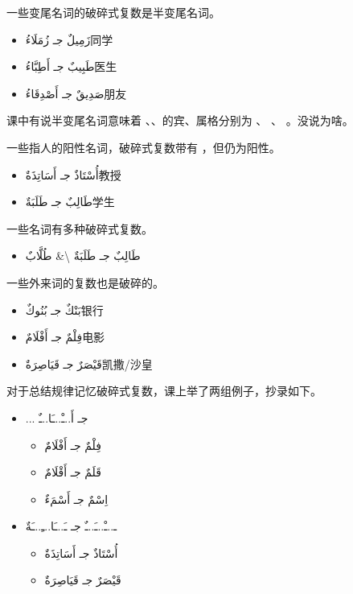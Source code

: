 一些变尾名词的破碎式复数是半变尾名词。

\begin{itemize}
    \item \ac{زَمِيلٌ جـ زُمَلَاءُ}{同学}
    \item \ac{طَبِيبٌ جـ أَطِبَّاءُ}{医生}
    \item \ac{صَدِيقٌ جـ أَصْدِقَاءُ}{朋友}
\end{itemize}

\begin{note}
    课中有说半变尾名词意味着 、、的宾、属格分别为 、 、 。没说为啥。
\end{note}

一些指人的阳性名词，破碎式复数带有 ，但仍为阳性。

\begin{itemize}
    \item \ac{أُسْتَاذٌ جـ أَسَاتِذَةٌ}{教授}
    \item \ac{طَالِبٌ جـ طَلَبَةٌ}{学生}
\end{itemize}

一些名词有多种破碎式复数。

\begin{itemize}
    \item \ac{طَالِبٌ جـ طَلَبَةٌ \& طُلَّابٌ}{}
\end{itemize}

一些外来词的复数也是破碎的。

\begin{itemize}
    \item \ac{بَنْكٌ جـ بُنُوكٌ}{银行}
    \item \ac{فِلْمٌ جـ أَفْلَامٌ}{电影}
    \item \ac{قَيْصَرٌ جـ قَيَاصِرَةٌ}{凯撒/沙皇}
\end{itemize}

\begin{note}
    对于总结规律记忆破碎式复数，课上举了两组例子，抄录如下。
    \begin{Arabic}
        \begin{itemize}
            \item ... جـ أَ..ـْ..ـَا..ـٌ
            \begin{itemize}
                \item فِلْمٌ جـ أَفْلَامٌ
                \item قَلَمٌ جـ أَقْلَامٌ
                \item اِسْمٌ جـ أَسْمَءٌ
            \end{itemize}
            \item ـ..ـْ..ـَ..ـٌ جـ ـَ..ـَا..ـِ..ـَةٌ
            \begin{itemize}
                \item أُسْتَاذٌ جـ أَسَاتِذَةٌ
                \item قَيْصَرٌ جـ قَيَاصِرَةٌ
            \end{itemize}
        \end{itemize}
    \end{Arabic}
\end{note}